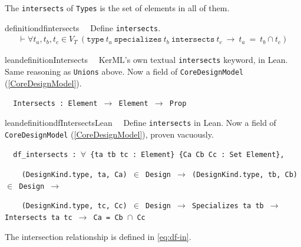 
\pn The \texttt{intersects} of \texttt{Types} is the set of elements in all of them.  

\begin{restatable}{definition}{dfintersects}~~  Define \texttt{intersects}.
\begin{align}
\vdash \forall t_a , t_b, t_c \in V_T~(\texttt{type}~t_a~\texttt{specializes}~t_b~\texttt{intersects}~t_c~ \rightarrow ~t_a~=~t_b \cap t_c)\label{eq:df-intersects}\tag{df-intersects}
\end{align}
\end{restatable}

\begin{restatable}{leandefinition}{Intersects}~~ KerML's own textual \texttt{intersects}
keyword, in Lean. Same reasoning as \texttt{Unions} above. Now a field of \texttt{CoreDesignModel}
(\ref{CoreDesignModel}).

\texttt{~~Intersects : Element $\to$ Element $\to$ Prop}
\label{Intersects}
\end{restatable}

\begin{restatable}{leandefinition}{dfIntersectsLean}~~ Define \texttt{intersects} in Lean.
Now a field of \texttt{CoreDesignModel} (\ref{CoreDesignModel}), proven vacuously.

\texttt{~~df\_intersects : $\forall$ \{ta tb tc : Element\} \{Ca Cb Cc : Set Element\},}

\texttt{~~~~(DesignKind.type, ta, Ca) $\in$ Design $\to$ (DesignKind.type, tb, Cb) $\in$ Design $\to$}

\texttt{~~~~(DesignKind.type, tc, Cc) $\in$ Design $\to$ Specializes ta tb $\to$ Intersects ta tc $\to$ Ca = Cb $\cap$ Cc}
\label{df_intersects}
\end{restatable}

\pn The intersection relationship is defined in \ref{eq:df-in}.

